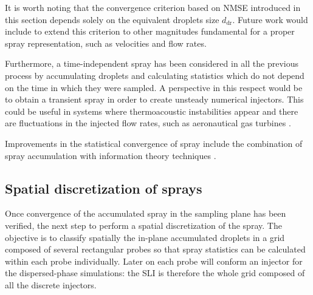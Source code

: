 It is worth noting that the convergence criterion based on NMSE introduced in this section depends solely on the equivalent droplets size $d_\mathrm{dr}$. Future work would include to extend this criterion to other magnitudes fundamental for a proper spray representation, such as velocities and flow rates. 

Furthermore, a time-independent spray has been considered in all the previous process by accumulating droplets and calculating statistics which do not depend on the time in which they were sampled. A perspective in this respect would be to obtain a transient spray in order to create unsteady numerical injectors. This could be useful in systems where thermoacoustic instabilities appear and there are fluctuations in the injected flow rates, such as aeronautical gas turbines .

Improvements in the statistical convergence of spray include the combination of spray accumulation with information theory techniques .


%
%
%

\subsection{Spatial discretization of sprays}
\label{subsec:SLI_spatial_discretization}

Once convergence of the accumulated spray in the sampling plane has been verified, the next step to perform a spatial discretization of the spray. The objective is to classify spatially the in-plane accumulated droplets in a grid composed of several rectangular probes so that spray statistics can be calculated within each probe individually. Later on each probe will conform an injector for the dispersed-phase simulations: the SLI is therefore the whole grid composed of all the discrete injectors.

